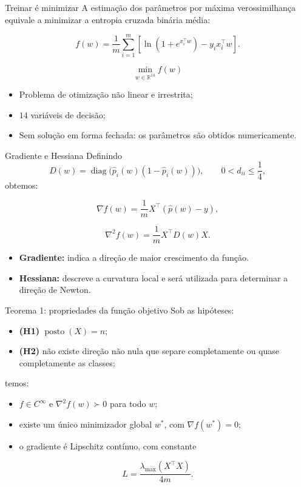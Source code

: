 \documentclass[aspectratio=169,11pt]{beamer}
\begin{document}
\begin{frame}{Treinar é minimizar}
A estimação dos parâmetros por máxima verossimilhança equivale a minimizar a entropia cruzada binária média:

\[
f(w)=\frac{1}{m}\sum_{i=1}^{m}
\left[
\ln(1+e^{x_i^\top w})-y_i x_i^\top w
\right].
\]

\vspace{2mm}
\[
\boxed{
\min_{w\in\mathbb{R}^{14}} f(w)
}
\]

\begin{itemize}
    \item Problema de otimização não linear e irrestrita;
    \item $14$ variáveis de decisão;
    \item Sem solução em forma fechada: os parâmetros são obtidos numericamente.
\end{itemize}
\end{frame}

\begin{frame}{Gradiente e Hessiana}
Definindo
\[
D(w)=\operatorname{diag}\big(\hat p_i(w)(1-\hat p_i(w))\big),
\qquad 0<d_{ii}\leq \frac14,
\]
obtemos:

\[
\nabla f(w)=\frac{1}{m}X^\top(\hat p(w)-y),
\]

\[
\nabla^2 f(w)=\frac{1}{m}X^\top D(w)X.
\]

\vspace{3mm}
\begin{itemize}
    \item \textbf{Gradiente:} indica a direção de maior crescimento da função.
    \item \textbf{Hessiana:} descreve a curvatura local e será utilizada para determinar a direção de Newton.
\end{itemize}
\end{frame}

\begin{frame}{Teorema 1: propriedades da função objetivo}
Sob as hipóteses:

\begin{itemize}
    \item \textbf{(H1)} $\operatorname{posto}(X)=n$;
    \item \textbf{(H2)} não existe direção não nula que separe completamente ou quase completamente as classes;
\end{itemize}

temos:

\begin{itemize}
    \item $f\in C^\infty$ e $\nabla^2 f(w)\succ0$ para todo $w$;
    \item existe um único minimizador global $w^*$, com $\nabla f(w^*)=0$;
    \item o gradiente é Lipschitz contínuo, com constante
\end{itemize}

\[
L=\frac{\lambda_{\max}(X^\top X)}{4m}.
\]
\end{frame}
\end{document}
